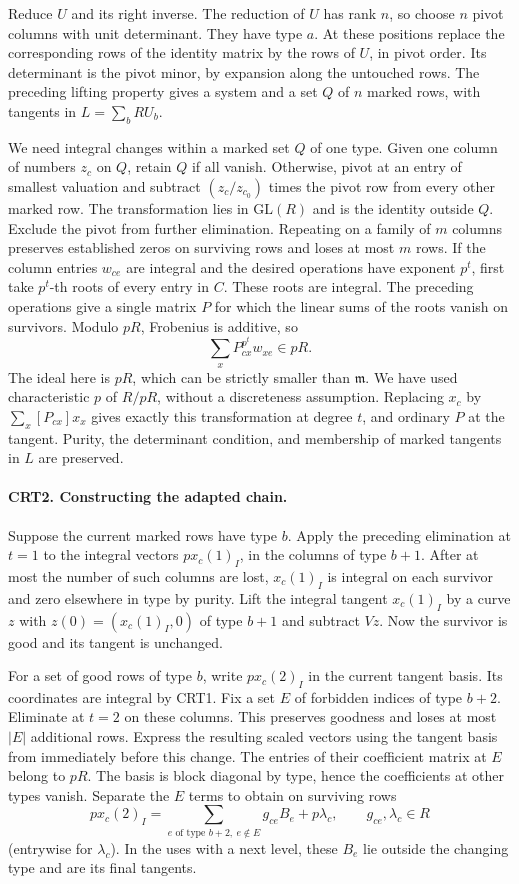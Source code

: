 Reduce $U$ and its right inverse. The reduction of $U$ has rank
$n$, so choose $n$ pivot columns with unit determinant. They have
type $a$. At these positions replace the corresponding rows of the
identity matrix by the rows of $U$, in pivot order. Its determinant
is the pivot minor, by expansion along the untouched rows. The
preceding lifting property gives a system and a set $Q$ of $n$
marked rows, with tangents in $L=\sum_b R U_b$.

We need integral changes within a marked set $Q$ of one type.
Given one column of numbers $z_c$ on $Q$, retain $Q$ if all vanish.
Otherwise, pivot at an entry of smallest valuation and subtract
$(z_c/z_{c_0})$ times the pivot row from every other marked row.
The transformation lies in $\mathrm{GL}(R)$ and is the identity
outside $Q$. Exclude the pivot from further elimination. Repeating
on a family of $m$ columns preserves established zeros on surviving
rows and loses at most $m$ rows. If the column entries $w_{ce}$ are
integral and the desired operations have exponent $p^t$, first take
$p^t$-th roots of every entry in $C$. These roots are integral.
The preceding operations give a single matrix $P$ for which the
linear sums of the roots vanish on survivors. Modulo $pR$, Frobenius
is additive, so
\[
             \sum_x P_{cx}^{p^t} w_{xe}\in pR .
\]
The ideal here is $pR$, which can be strictly smaller than
$\mathfrak m$. We have used characteristic $p$ of $R/pR$,
without a discreteness assumption. Replacing $x_c$ by
$\sum_x[P_{cx}]x_x$ gives exactly this transformation at
degree $t$, and ordinary $P$ at the tangent. Purity, the determinant
condition, and membership of marked tangents in $L$ are preserved.

\paragraph{CRT2. Constructing the adapted chain.}
Suppose the current marked rows have type $b$. Apply the preceding
elimination at $t=1$ to the integral vectors $p x_c(1)_I$, in the
columns of type $b+1$. After at most the number of such columns are
lost, $x_c(1)_I$ is integral on each survivor and zero elsewhere
in type by purity. Lift the integral tangent $x_c(1)_I$ by a curve $z$ with
$z(0)=(x_c(1)_I,0)$
of type $b+1$ and subtract $Vz$. Now the survivor is good and its
tangent is unchanged.

For a set of good rows of type $b$, write $p x_c(2)_I$ in the
current tangent basis. Its coordinates are integral by CRT1.
Fix a set $E$ of forbidden indices of type $b+2$. Eliminate at
$t=2$ on these columns. This preserves goodness and loses at most
$|E|$ additional rows. Express the resulting scaled vectors using
the tangent basis from immediately before this change. The entries
of their coefficient matrix at $E$ belong to $pR$. The basis is
block diagonal by type, hence the coefficients at other types
vanish. Separate the $E$ terms to obtain on surviving rows
\[
    p x_c(2)_I=\sum_{e\text{ of type }b+2,\ e\notin E}
                 g_{ce}B_e+p\lambda_c,\qquad
                 g_{ce},\lambda_c\in R
\]
(entrywise for $\lambda_c$). In the uses with a next level, these
$B_e$ lie outside the changing type and are its final tangents.

